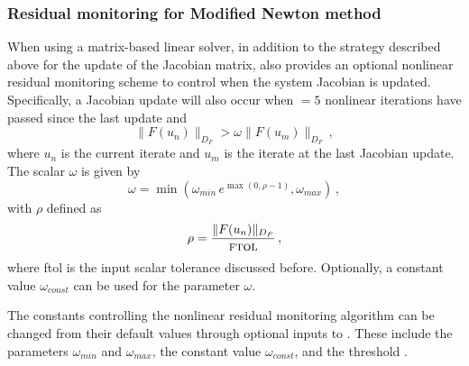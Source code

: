 
\subsubsection*{Residual monitoring for Modified Newton method}
\label{ss:ModifiedNewtonResidualMon}
When using a matrix-based linear solver, in addition to the strategy
described above for the update of the Jacobian matrix, {\kinsol} also
provides an optional nonlinear residual monitoring scheme to control
when the system Jacobian is updated. Specifically, a Jacobian update
will also occur when $=5$ nonlinear iterations have
passed since the last update and
\[ \|F(u_n)\|_{D_F} > \omega \|F(u_m)\|_{D_F} \, , \]
where $u_n$ is the current iterate and $u_m$ is the iterate at the last Jacobian
update. The scalar $\omega$ is given by
\begin{equation}\label{resmon_omega}
\omega = \min \left (\omega_{min} \, e^{\max \left ( 0 , \rho - 1 \right )} , \omega_{max}\right ) \, ,
\end{equation}
with $\rho$ defined as
\begin{equation}
\rho = \frac{\|F(u_n) \|_{D_F}}{\mbox{{\sc ftol}}} \, ,
\end{equation}
where {\sc ftol} is the input scalar tolerance discussed before.
Optionally, a constant value $\omega_{const}$ can be used for the parameter $\omega$.

The constants controlling the nonlinear residual monitoring algorithm can
be changed from their default values through optional inputs to {\kinsol}.
These include the parameters $\omega_{min}$ and $\omega_{max}$, the constant
value $\omega_{const}$, and the threshold .


